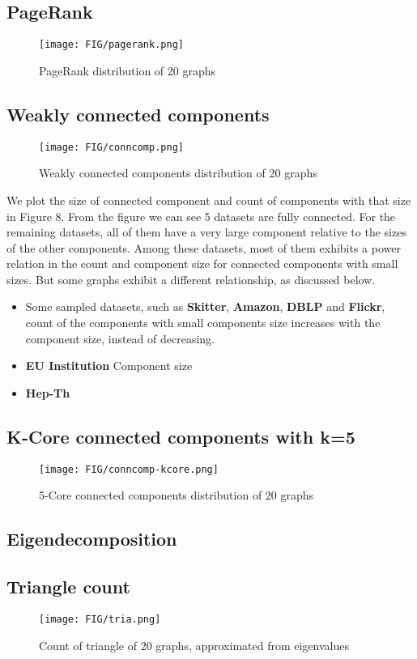 \subsection{PageRank}
\begin{figure}[H]
\begin{center}
\texttt{[image: FIG/pagerank.png]}
\caption{PageRank distribution of 20 graphs}
\end{center}
\end{figure}



\subsection{Weakly connected components}
\begin{figure}[H]
\begin{center}
\texttt{[image: FIG/conncomp.png]}
\caption{Weakly connected components distribution of 20 graphs}
\end{center}
\end{figure}

We plot the size of connected component and count of components with that size in Figure 8. From the figure we can see 5 datasets are fully connected. For the remaining datasets, all of them have a very large component relative to the sizes of the other components. Among these datasets, most of them exhibits a power relation in the count and component size for connected components with small sizes. But some graphs exhibit a different relationship, as discussed below.

\begin{itemize}
\item Some sampled datasets, such as \textbf{Skitter}, \textbf{Amazon}, \textbf{DBLP} and \textbf{Flickr}, count of the components with small components size increases with the component size, instead of decreasing.
\item \textbf{EU Institution} Component size 
\item \textbf{Hep-Th} 
\end{itemize}

\subsection{K-Core connected components with k=5}
\begin{figure}[H]
\begin{center}
\texttt{[image: FIG/conncomp-kcore.png]}
\caption{5-Core connected components distribution of 20 graphs}
\end{center}
\end{figure}

\subsection{Eigendecomposition}
\subsection{Triangle count}
\begin{figure}[H]
\begin{center}
\texttt{[image: FIG/tria.png]}
\caption{Count of triangle of 20 graphs, approximated from eigenvalues}
\end{center}
\end{figure}